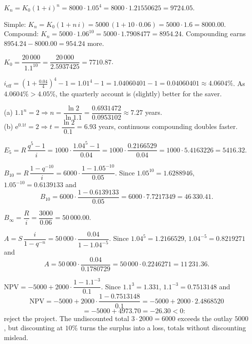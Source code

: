 \begin{solutions}
  \item $K_{n}=K_{0}(1+i)^{n}=8000\cdot 1.05^{4}
        =8000\cdot 1.21550625=9724.05$.

  \item Simple: $K_{n}=K_{0}(1+n\,i)=5000\,(1+10\cdot 0.06)
        =5000\cdot 1.6=8000.00$. Compound:
        $K_{n}=5000\cdot 1.06^{10}=5000\cdot 1.7908477=8954.24$.
        Compounding earns $8954.24-8000.00=954.24$ more.

  \item $K_{0}=\dfrac{20\,000}{1.1^{10}}=\dfrac{20\,000}{2.5937425}
        =7710.87$.

  \item $i_{\mathrm{eff}}=\left(1+\frac{0.04}{4}\right)^{4}-1
        =1.01^{4}-1=1.04060401-1=0.04060401\approx 4.0604\%$. As
        $4.0604\%>4.05\%$, the quarterly account is (slightly) better
        for the saver.

  \item (a) $1.1^{n}=2\Rightarrow n=\dfrac{\ln 2}{\ln 1.1}
        =\dfrac{0.6931472}{0.0953102}\approx 7.27$ years.\\
        (b) $\mathrm{e}^{0.1t}=2\Rightarrow t=\dfrac{\ln 2}{0.1}
        =6.93$ years, continuous compounding doubles faster.

  \item $E_{5}=R\,\dfrac{q^{5}-1}{i}
        =1000\cdot\dfrac{1.04^{5}-1}{0.04}
        =1000\cdot\dfrac{0.2166529}{0.04}
        =1000\cdot 5.4163226=5416.32$.

  \item $B_{10}=R\,\dfrac{1-q^{-10}}{i}
        =6000\cdot\dfrac{1-1.05^{-10}}{0.05}$. Since
        $1.05^{10}=1.6288946$, $1.05^{-10}=0.6139133$ and
        \[
          B_{10}=6000\cdot\frac{1-0.6139133}{0.05}
                =6000\cdot 7.7217349=46\,330.41 .
        \]

  \item $B_{\infty}=\dfrac{R}{i}=\dfrac{3000}{0.06}=50\,000.00$.

  \item $A=S\,\dfrac{i}{1-q^{-n}}
        =50\,000\cdot\dfrac{0.04}{1-1.04^{-5}}$. Since
        $1.04^{5}=1.2166529$, $1.04^{-5}=0.8219271$ and
        \[
          A=50\,000\cdot\frac{0.04}{0.1780729}
           =50\,000\cdot 0.2246271=11\,231.36 .
        \]

  \item $\mathrm{NPV}=-5000+2000\cdot\dfrac{1-1.1^{-3}}{0.1}$. Since
        $1.1^{3}=1.331$, $1.1^{-3}=0.7513148$ and
        \[
          \mathrm{NPV}=-5000+2000\cdot\frac{1-0.7513148}{0.1}
                      =-5000+2000\cdot 2.4868520
        \]
        \[
          \phantom{\mathrm{NPV}}=-5000+4973.70=-26.30<0 :
        \]
        reject the project. The undiscounted total $3\cdot 2000=6000$
        exceeds the outlay $5000$, but discounting at $10\%$ turns the
        surplus into a loss, totals without discounting mislead.
\end{solutions}
